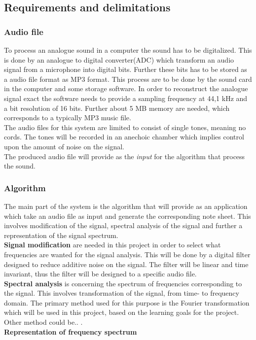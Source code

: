         
\subsection{Requirements and delimitations}
\subsubsection{Audio file}
To process an analogue sound in a computer the sound has to be digitalized. This is done by an analogue to digital converter(ADC) which transform an audio signal from a microphone into digital bits. Further these bits has to be stored as a audio file format as MP3 format. This process are to be done by the sound card in the computer and some storage software. In order to reconstruct the analogue signal exact the software needs to provide a sampling frequency at 44,1 kHz and a bit resolution of 16 bits\cite{Mic}. Further about 5 MB memory are needed, which corresponds to a typically MP3 music file. \\
The audio files for this system are limited to consist of single tones, meaning no cords. The tones will be recorded in an anechoic chamber which implies control upon the amount of noise on the signal.\\      
The produced audio file will provide as the \textit{input} for the algorithm that process the sound. 

\subsubsection{Algorithm}
The main part of the system is the algorithm that will provide as an application which take an audio file as input and generate the corresponding note sheet. This involves modification of the signal, spectral analysis of the signal and further a representation of the signal spectrum.\\
\textbf{Signal modification} are needed in this project in order to select what frequencies are wanted for the signal analysis. This will be done by a digital filter designed to reduce additive noise on the signal. The filter will be linear and time invariant, thus the filter will be designed to a specific audio file.             
\\ 
\textbf{Spectral analysis} is concerning the spectrum of frequencies corresponding to the signal. This involves transformation of the signal, from time- to frequency domain.     
The primary method used for this purpose is the Fourier transformation which will be used in this project, based on the learning goals for the project. Other method could be.. . \\   
\textbf{Representation of frequency spectrum} 

